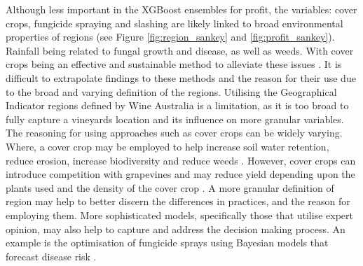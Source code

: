 \documentclass[review,12pt,authoryear]{elsarticle}
\begin{document}
\begin{linenumbers}
Although less important in the XGBoost ensembles for profit, the variables: cover crops, fungicide spraying and slashing are likely linked to broad environmental properties of regions (see Figure \ref{fig:region_sankey} and \ref{fig:profit_sankey}). Rainfall being related to fungal growth and disease, as well as weeds. With cover crops being an effective and sustainable method to alleviate these issues \citep{delpuechAdaptingCoverCrop2018}. It is difficult to extrapolate findings to these methods and the reason for their use due to the broad and varying definition of the regions. Utilising the Geographical Indicator regions defined by Wine Australia \citep{wineaustraliaWineAustraliaOpenData2021} is a limitation, as it is too broad to fully capture a vineyards location and its influence on more granular variables. The reasoning for using approaches such as cover crops can be widely varying. Where, a cover crop may be employed to help increase soil water retention, reduce erosion, increase biodiversity and reduce weeds \citep{capelloEffectsTractorPasses2019,capelloPermanentCoverSoil2020,delpuechAdaptingCoverCrop2018}. However, cover crops can introduce competition with grapevines and may reduce yield depending upon the plants used and the density of the cover crop \citep{goslingLongtermChangesSoil2005,monteiroInfluenceCoverCrop2007}. A more granular definition of region may help to better discern the differences in practices, and the reason for employing them. More sophisticated models, specifically those that utilise expert opinion, may also help to capture and address the decision making process. An example is the optimisation of fungicide sprays using Bayesian models that forecast disease risk \citep{luDiseaseRiskForecasting2020}. 






\end{linenumbers}
\end{document}
